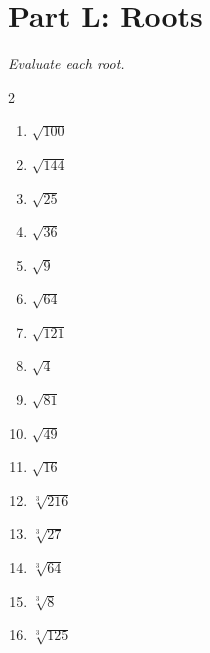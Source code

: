 \documentclass[11pt]{article}
\begin{document}
\section*{Part L: Roots}
\noindent\textit{Evaluate each root.}
\begin{multicols}{2}
\begin{enumerate}
  \item $\sqrt{100}$
  \vspace{1.2cm}
  \item $\sqrt{144}$
  \vspace{1.2cm}
  \item $\sqrt{25}$
  \vspace{1.2cm}
  \item $\sqrt{36}$
  \vspace{1.2cm}
  \item $\sqrt{9}$
  \vspace{1.2cm}
  \item $\sqrt{64}$
  \vspace{1.2cm}
  \item $\sqrt{121}$
  \vspace{1.2cm}
  \item $\sqrt{4}$
  \vspace{1.2cm}
  \item $\sqrt{81}$
  \vspace{1.2cm}
  \item $\sqrt{49}$
  \vspace{1.2cm}
  \item $\sqrt{16}$
  \vspace{1.2cm}
  \item $\sqrt[3]{216}$
  \vspace{1.2cm}
  \item $\sqrt[3]{27}$
  \vspace{1.2cm}
  \item $\sqrt[3]{64}$
  \vspace{1.2cm}
  \item $\sqrt[3]{8}$
  \vspace{1.2cm}
  \item $\sqrt[3]{125}$
  \vspace{1.2cm}
\end{enumerate}
\end{multicols}
\end{document}
